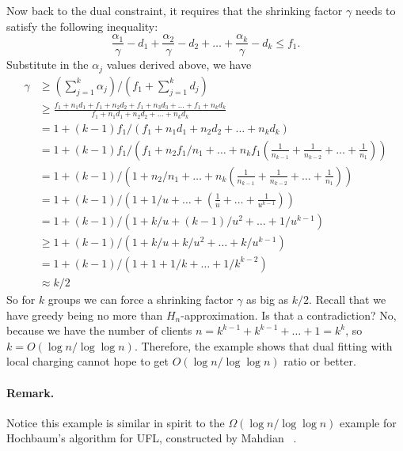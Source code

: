 \documentclass[oneside,final]{ucr}
\begin{document}
Now back to the dual constraint, it requires that the
shrinking factor $\gamma$ needs to satisfy the following
inequality:
\begin{equation}
  \frac{\alpha_1}{\gamma} - d_1 + \frac{\alpha_2}{\gamma} - d_2 +
  \ldots + \frac{\alpha_k}{\gamma} - d_k \leq f_1.
\end{equation}
Substitute in the $\alpha_j$ values derived above, we have
\begin{align*}
  \gamma &\geq (\sum_{j=1}^k \alpha_j) / (f_1 + \sum_{j=1}^k d_j)\\
  &\geq \frac{f_1 + n_1 d_1 + f_1 + n_2 d_2 + f_1 + n_3 d_3 + \ldots +
    f_1 + n_k
    d_k}{f_1 + n_1 d_1 + n_2 d_2 + \ldots + n_k d_k}\\
  &= 1 + (k-1)f_1 / (f_1 + n_1 d_1 + n_2 d_2 + \ldots + n_k d_k)\\
  &= 1 + (k-1)f_1 / \left(f_1 + n_2 f_1 / n_1 + \ldots + n_k f_1
    (\frac{1}{n_{k-1}} + \frac{1}{n_{k-2}} + \ldots +
    \frac{1}{n_1})\right)\\
  &= 1 + (k-1) / \left(1 + n_2 / n_1 + \ldots + n_k
    (\frac{1}{n_{k-1}} + \frac{1}{n_{k-2}} + \ldots +
    \frac{1}{n_1})\right)\\
  &= 1 + (k-1) / \left(1 + 1/u + \ldots + (\frac{1}{u} + \ldots +
    \frac{1}{u^{k-1}})\right)\\
  &= 1 + (k-1) / \left(1 + k/u + (k-1)/u^2 + \ldots +
    1/u^{k-1}\right)\\
  &\geq 1 + (k-1) / \left(1 + k/u + k/u^2 + \ldots +
    k/u^{k-1}\right)\\
  &= 1 + (k-1) / \left(1 + 1 + 1/k + \ldots + 1/k^{k-2}\right)\\
  &\approx k/2
\end{align*}
So for $k$ groups we can force a shrinking factor $\gamma$
as big as $k/2$. Recall that we have greedy being no more
than $H_n$-approximation. Is that a contradiction? No,
because we have the number of clients $n=k^{k-1} + k^{k-1} +
\ldots + 1 = k^k$, so $k = O(\log n / \log\log
n)$. Therefore, the example shows that dual fitting with
local charging cannot hope to get $O(\log n / \log\log n)$
ratio or better.

\paragraph{Remark.} Notice this example is similar in spirit
to the $\Omega(\log n/ \log\log n)$ example for Hochbaum's
algorithm for UFL, constructed by Mahdian {\etal}
~\cite{JainMMSV03}.
\end{document}
